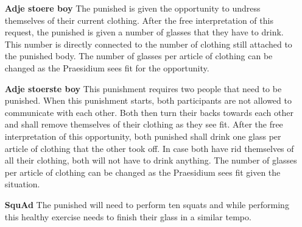 \begin{itemize}
    
    \item[\textbf{Adje stoere boy}] %
    The punished is given the opportunity to undress themselves of their current clothing. After the free interpretation of this request, the punished is given a number of glasses that they have to drink. This number is directly connected to the number of clothing still attached to the punished body. The number of glasses per article of clothing can be changed as the Praesidium sees fit for the opportunity.
    
    \item[\textbf{Adje stoerste boy}] %
    This punishment requires two people that need to be punished. When this punishment starts, both participants are not allowed to communicate with each other. Both then turn their backs towards each other and shall remove themselves of their clothing as they see fit. After the free interpretation of this opportunity, both punished shall drink one glass per article of clothing that the other took off. In case both have rid themselves of all their clothing, both will not have to drink anything. The number of glasses per article of clothing can be changed as the Praesidium sees fit given the situation. 

    \item[\textbf{SquAd}] %
    The punished will need to perform ten squats and while performing this healthy exercise needs to finish their glass in a similar tempo. 
    

\end{itemize}
